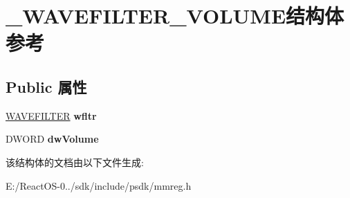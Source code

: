 \hypertarget{struct___w_a_v_e_f_i_l_t_e_r___v_o_l_u_m_e}{}\section{\+\_\+\+W\+A\+V\+E\+F\+I\+L\+T\+E\+R\+\_\+\+V\+O\+L\+U\+M\+E结构体 参考}
\label{struct___w_a_v_e_f_i_l_t_e_r___v_o_l_u_m_e}
\subsection*{Public 属性}
\begin{DoxyCompactItemize}
\item 
\mbox{\label{struct___w_a_v_e_f_i_l_t_e_r___v_o_l_u_m_e_a9e26c67e49d65476f288a1f50f526795}} 
\hyperlink{struct___w_a_v_e_f_i_l_t_e_r}{W\+A\+V\+E\+F\+I\+L\+T\+ER} {\bfseries wfltr}
\item 
\mbox{\label{struct___w_a_v_e_f_i_l_t_e_r___v_o_l_u_m_e_a34d835f1adca3ca8c417ab8dc1bac635}} 
D\+W\+O\+RD {\bfseries dw\+Volume}
\end{DoxyCompactItemize}


该结构体的文档由以下文件生成\+:\begin{DoxyCompactItemize}
\item 
E\+:/\+React\+O\+S-\/0../sdk/include/psdk/mmreg.\+h\end{DoxyCompactItemize}
